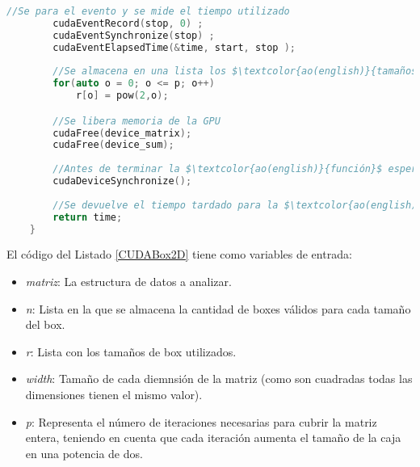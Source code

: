 \begin{lstlisting}[language=C++,caption={Primera versión del Boxcount2D paralelizado con CUDA},label=CUDABox2D,basicstyle=\tiny]
        //Se para el evento y se mide el tiempo utilizado
        cudaEventRecord(stop, 0) ;
        cudaEventSynchronize(stop) ;
        cudaEventElapsedTime(&time, start, stop );
    
        //Se almacena en una lista los $\textcolor{ao(english)}{tamaños}$ de caja que se han utilizado
        for(auto o = 0; o <= p; o++)
            r[o] = pow(2,o); 

        //Se libera memoria de la GPU
        cudaFree(device_matrix);
        cudaFree(device_sum);
    
        //Antes de terminar la $\textcolor{ao(english)}{función}$ esperamos que la memoria haya sido correctamente liberada
        cudaDeviceSynchronize();
    
        //Se devuelve el tiempo tardado para la $\textcolor{ao(english)}{realización}$ del experimento
        return time;
    }
\end{lstlisting}

El código del Listado \ref{CUDABox2D} tiene como variables de entrada:

\begin{itemize}
    \item \textit{matriz}: La estructura de datos a analizar.
    \item \textit{n}: Lista en la que se almacena la cantidad de boxes válidos para cada tamaño del box.
    \item \textit{r}: Lista con los tamaños de box utilizados.
    \item \textit{width}: Tamaño de cada diemnsión de la matriz (como son cuadradas todas las dimensiones tienen el mismo valor).
    \item \textit{p}: Representa el número de iteraciones necesarias para cubrir la matriz entera, teniendo en cuenta que cada iteración aumenta el tamaño de la caja en una potencia de dos.
\end{itemize}

